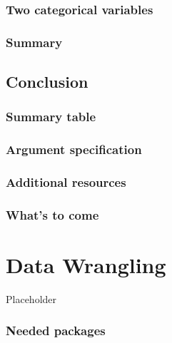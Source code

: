\documentclass[12pt, krantz2,]{krantz}
\begin{document}
\hypertarget{two-categ-barplot}{%
\subsection{Two categorical variables}\label{two-categ-barplot}}

\hypertarget{summary-4}{%
\subsection{Summary}\label{summary-4}}

\hypertarget{conclusion-1}{%
\section{Conclusion}\label{conclusion-1}}

\hypertarget{summary-table}{%
\subsection{Summary table}\label{summary-table}}

\hypertarget{argument-specification}{%
\subsection{Argument specification}\label{argument-specification}}

\hypertarget{additional-resources-1}{%
\subsection{Additional resources}\label{additional-resources-1}}

\hypertarget{whats-to-come-3}{%
\subsection{What's to come}\label{whats-to-come-3}}

\hypertarget{wrangling}{%
\chapter{Data Wrangling}\label{wrangling}}

Placeholder

\hypertarget{needed-packages-1}{%
\subsection*{Needed packages}\label{needed-packages-1}}
\end{document}
